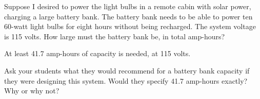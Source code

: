 

Suppose I desired to power the light bulbs in a remote cabin with solar power, charging a large battery bank.  The battery bank needs to be able to power ten 60-watt light bulbs for eight hours without being recharged.  The system voltage is 115 volts.  How large must the battery bank be, in total amp-hours?







At least 41.7 amp-hours of capacity is needed, at 115 volts.







Ask your students what they would recommend for a battery bank capacity if they were designing this system.  Would they specify 41.7 amp-hours exactly?  Why or why not?




